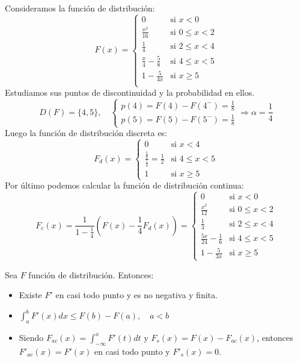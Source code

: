 \begin{example}
    Consideramos la función de distribución:
    $$F(x) = \begin{cases}
            0                         & \text{si } x < 0        \\
            \frac{x^2}{16}            & \text{si } 0 \leq x < 2 \\
            \frac{1}{4}               & \text{si } 2 \leq x < 4 \\
            \frac{x}{4} - \frac{5}{8} & \text{si } 4 \leq x < 5 \\
            1 - \frac{5}{4x}          & \text{si } x \geq 5     \\
        \end{cases}$$
    Estudiamos sus puntos de discontinuidad y la probabilidad en ellos.
    $$D(F) = \{4, 5\}, \quad \begin{cases}
            p(4) = F(4) - F(4^-) = \frac{1}{8} \\
            p(5) = F(5) - F(5^-) = \frac{1}{8}
        \end{cases}
        \Rightarrow \alpha = \frac{1}{4}$$
    Luego la función de distribución discreta es:
    $$F_d(x) = \begin{cases}
            0                                             & \text{si } x < 4        \\
            \frac{\frac{1}{8}}{\frac{1}{4}} = \frac{1}{2} & \text{si } 4 \leq x < 5 \\
            1                                             & \text{si } x \geq 5
        \end{cases}$$
    Por último podemos calcular la función de distribución continua:
    $$F_c(x) = \frac{1}{1-\frac{1}{4}} \left( F(x) - \frac{1}{4}F_d(x) \right) = \begin{cases}
            0                           & \text{si } x < 0        \\
            \frac{x^2}{12}              & \text{si } 0 \leq x < 2 \\
            \frac{1}{3}                 & \text{si } 2 \leq x < 4 \\
            \frac{5x}{24} - \frac{1}{6} & \text{si } 4 \leq x < 5 \\
            1 - \frac{5}{3x}            & \text{si } x \geq 5
        \end{cases}$$
\end{example}

\begin{lemma}
    Sea $F$ función de distribución.
    Entonces:
    \begin{itemize}
        \item Existe $F'$ en casi todo punto y es no negativa y finita.
        \item $\int_a^b F'(x) dx \leq F(b) - F(a), \quad a<b$
        \item Siendo $F_{ac}(x) = \int_{-\infty}^x F'(t) dt$ y $F_s(x) = F(x) - F_{ac}(x)$, entonces $F'_{ac}(x) = F'(x)$ en casi todo punto y $F'_s(x) = 0$.
    \end{itemize}
\end{lemma}

